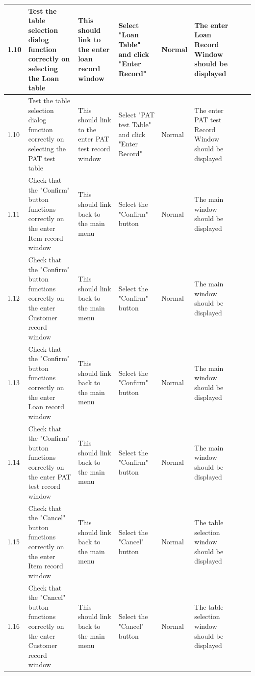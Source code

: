 \begin{landscape}
\begin{center}
\begin{longtable}{|p{1.5cm}|p{2cm}|p{3cm}|p{2cm}|p{2cm}|p{2.5cm}|p{2cm}|p{2cm}|}
        1.10 & Test the table selection dialog function correctly on selecting the Loan table & This should link to the enter loan record window & Select "Loan 
        Table" and click "Enter Record" & Normal & The enter Loan Record Window should be displayed & & \\ \hline
        
        1.10 & Test the table selection dialog function correctly on selecting the PAT test table & This should link to the enter PAT test record window & Select "PAT 
        test Table" and click "Enter Record" & Normal & The enter PAT test Record Window should be displayed & & \\ \hline
        
        1.11 & Check that the "Confirm" button functions correctly on the enter Item record window & This should link back to the main menu & Select the "Confirm" 
        button & Normal & The main window should be displayed & & \\ \hline
        
        1.12 & Check that the "Confirm" button functions correctly on the enter Customer record window & This should link back to the main menu & Select the "Confirm" 
        button & Normal & The main window should be displayed & & \\ \hline
        
        1.13 & Check that the "Confirm" button functions correctly on the enter Loan record window & This should link back to the main menu & Select the "Confirm" 
        button & Normal & The main window should be displayed & & \\ \hline
        
        1.14 & Check that the "Confirm" button functions correctly on the enter PAT test record window & This should link back to the main menu & Select the "Confirm" 
        button & Normal & The main window should be displayed & & \\ \hline
        
        1.15 & Check that the "Cancel" button functions correctly on the enter Item record window & This should link back to the main menu & Select the "Cancel" 
        button & Normal & The table selection window should be displayed & & \\ \hline
        
        1.16 & Check that the "Cancel" button functions correctly on the enter Customer record window & This should link back to the main menu & Select the "Cancel" 
        button & Normal & The table selection window should be displayed & & \\ \hline
        

\end{longtable}
\end{center}
\end{landscape}
